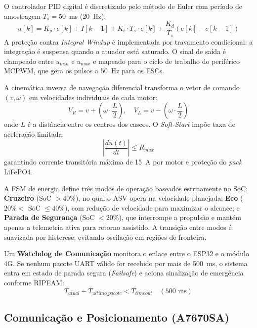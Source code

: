 \documentclass[12pt,a4paper]{article}
\begin{document}
O controlador PID digital é discretizado pelo método de Euler com período de amostragem $T_s = 50$~ms (20~Hz):
\begin{equation}
u[k] = K_p \cdot e[k] + I[k-1] + K_i \cdot T_s \cdot e[k] + \frac{K_d}{T_s}(e[k] - e[k-1])
\end{equation}
A proteção contra \textit{Integral Windup} é implementada por travamento condicional: a integração é suspensa quando o atuador está saturado. O sinal de saída é clampeado entre $u_{min}$ e $u_{max}$ e mapeado para o ciclo de trabalho do periférico MCPWM, que gera os pulsos a 50~Hz para os ESCs.

A cinemática inversa de navegação diferencial transforma o vetor de comando $(v, \omega)$ em velocidades individuais de cada motor:
\begin{equation}
V_R = v + \left(\omega \cdot \frac{L}{2}\right), \quad V_L = v - \left(\omega \cdot \frac{L}{2}\right)
\end{equation}
onde $L$ é a distância entre os centros dos cascos. O \textit{Soft-Start} impõe taxa de aceleração limitada:
\begin{equation}
\left|\frac{du(t)}{dt}\right| \le R_{max}
\end{equation}
garantindo corrente transitória máxima de 15~A por motor e proteção do \textit{pack} LiFePO4.

A FSM de energia define três modos de operação baseados estritamente no SoC: \textbf{Cruzeiro} (SoC $> 40\%$), no qual o ASV opera na velocidade planejada; \textbf{Eco} ($20\% <$ SoC $\le 40\%$), com redução de velocidade para maximizar o alcance; e \textbf{Parada de Segurança} (SoC $< 20\%$), que interrompe a propulsão e mantém apenas a telemetria ativa para retorno assistido. A transição entre modos é suavizada por histerese, evitando oscilação em regiões de fronteira.

Um \textbf{Watchdog de Comunicação} monitora o enlace entre o ESP32 e o módulo 4G. Se nenhum pacote UART válido for recebido por mais de 500~ms, o sistema entra em estado de parada segura (\textit{Failsafe}) e aciona sinalização de emergência conforme RIPEAM:
\begin{equation}
T_{atual} - T_{ultimo\_pacote} < T_{timeout} \quad (500\text{ ms})
\end{equation}

\subsection{Comunicação e Posicionamento (A7670SA)}
\end{document}
